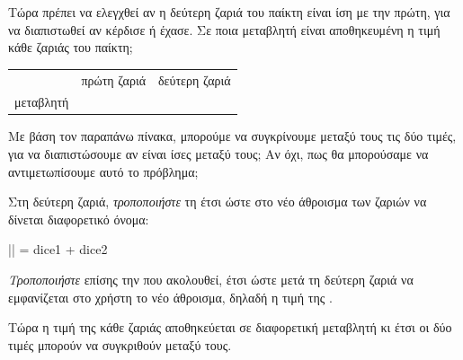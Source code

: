\documentclass[a4paper,11pt,oneside]{book}
\begin{document}
\begin{step}
Τώρα πρέπει να ελεγχθεί αν η δεύτερη ζαριά του παίκτη είναι ίση με την πρώτη, για να διαπιστωθεί αν κέρδισε ή έχασε. 
Σε ποια μεταβλητή είναι αποθηκευμένη η τιμή κάθε ζαριάς του παίκτη;
\begin{center}
\marginnote[18pt]{\icondiscuss}
\begin{tabular}{rp{80pt}p{80pt}}
& \hfill πρώτη ζαριά\hfill\mbox{} & \hfill δεύτερη ζαριά\hfill\mbox{} \\\addlinespace[2\parskip]
μεταβλητή & \dotfill & \dotfill
\end{tabular}
\end{center}

Με βάση τον παραπάνω πίνακα, μπορούμε να συγκρίνουμε μεταξύ τους τις δύο τιμές, για να διαπιστώσουμε αν είναι ίσες μεταξύ τους; Αν όχι, πως θα μπορούσαμε να αντιμετωπίσουμε αυτό το πρόβλημα;

\marginnote[14pt]{\icondiscuss}
\dottedline

\dottedline

\dottedline

Στη δεύτερη ζαριά, \emph{τροποποιήστε} τη  έτσι ώστε στο νέο άθροισμα των ζαριών να δίνεται διαφορετικό όνομα:

\begin{pyplain}
|| = dice1 + dice2
\end{pyplain}

\emph{Τροποποιήστε} επίσης την  που ακολουθεί, έτσι ώστε μετά τη δεύτερη ζαριά να εμφανίζεται στο χρήστη το νέο άθροισμα, δηλαδή η τιμή της .

Τώρα η τιμή της κάθε ζαριάς αποθηκεύεται σε διαφορετική μεταβλητή κι έτσι οι δύο τιμές μπορούν να συγκριθούν μεταξύ τους.
\end{step}
\end{document}

